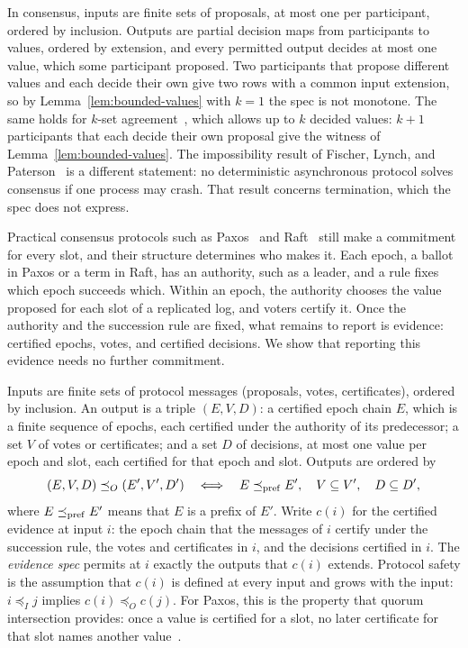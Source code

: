 \documentclass[sigconf]{cidr-2027}
\theoremstyle{remark}
\newcommand{\InputOrd}{\preceq_I}
\newcommand{\OutputOrd}{\preceq_O}
\newcommand{\commitment}{commitment\xspace}
\newcommand{\indesc}{input extension\xspace} %
\newcommand{\outrel}{extends\xspace}          %
\begin{document}
In consensus, inputs are finite sets of proposals, at most one per
participant, ordered by inclusion. Outputs are partial decision maps from
participants to values, ordered by extension, and every permitted output
decides at most one value, which some participant proposed. Two participants
that propose different values and each decide their own give two rows with a
common \indesc, so by Lemma~\ref{lem:bounded-values} with $k=1$ the spec is not
monotone. The same holds for $k$-set agreement~\cite{chaudhuri1993more}, which
allows up to $k$ decided values: $k+1$ participants that each decide their own
proposal give the witness of Lemma~\ref{lem:bounded-values}. The
impossibility result of Fischer, Lynch, and
Paterson~\cite{fischer1985impossibility} is a different statement: no
deterministic asynchronous protocol solves consensus if one process may crash. That result concerns termination, which the spec does not express.

Practical consensus protocols such as Paxos~\cite{lamport2001paxos} and
Raft~\cite{ongaro2014raft} still make a \commitment for every slot, and their
structure determines who makes it. Each epoch, a ballot in Paxos or a term in
Raft, has an authority, such as a leader, and a rule fixes which epoch succeeds
which. Within an epoch, the authority chooses the value proposed for each slot of a
replicated log, and voters certify it. Once the authority and the succession
rule are fixed, what remains to report is evidence: certified epochs, votes,
and certified decisions. We show that reporting this evidence needs no
further \commitment.

Inputs are finite sets of protocol messages (proposals, votes,
certificates), ordered by inclusion. An output is a triple $(E,V,D)$: a
certified epoch chain $E$, which is a finite sequence of epochs, each
certified under the authority of its predecessor; a set $V$ of votes or
certificates; and a set $D$ of decisions, at most one value per epoch and slot,
each certified for that epoch and slot. Outputs are ordered by
\begin{equation}
  (E,V,D)\OutputOrd(E',V',D')
  \quad\Longleftrightarrow\quad
  E\preceq_{\rm pref}E',\quad V\subseteq V',\quad D\subseteq D',
  \label{eq:authority-refinement}
\end{equation}
where $E\preceq_{\rm pref}E'$ means that $E$ is a prefix of $E'$. Write $c(i)$
for the certified evidence at input $i$: the epoch chain that the messages of
$i$ certify under the succession rule, the votes and certificates in $i$, and
the decisions certified in $i$. The \emph{evidence spec} permits at $i$
exactly the outputs that $c(i)$ \outrel. Protocol safety is the assumption
that $c(i)$ is defined at every input and grows with the input:
$i\InputOrd j$ implies $c(i)\OutputOrd c(j)$. For Paxos, this is the
property that quorum intersection provides: once a value is certified for a
slot, no later certificate for that slot names another
value~\cite{lamport2001paxos}.
\end{document}
